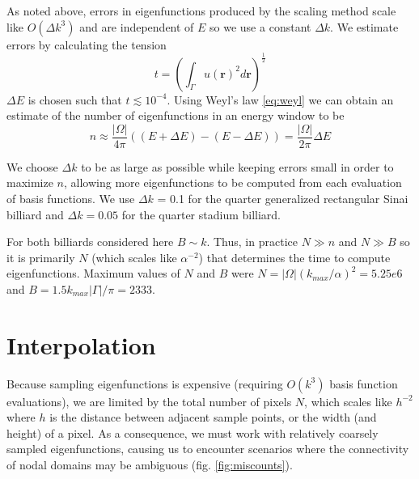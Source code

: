 \documentclass{report}
\newcommand{\rr}[0]{\mathbf{r}}
\begin{document}
As noted above, errors in eigenfunctions produced by the scaling method scale like $O({\Delta k}^{3})$ and are independent of $E$ so we use a constant $\Delta k$. We estimate errors by calculating the tension
\[
t = \left( \int_{\Gamma} u(\rr)^{2} d\rr \right)^{\frac{1}{2}}
\]
$\Delta E$ is chosen such that $t \lesssim 10^{-4}$. Using Weyl's law \ref{eq:weyl} we can obtain an estimate of the number of eigenfunctions in an energy window to be
\[
n \approx \frac{\vert \Omega \vert}{4 \pi} ((E + \Delta E) - (E - \Delta E)) = \frac{\vert \Omega \vert}{2 \pi} \Delta E
\]

We choose $\Delta k$ to be as large as possible while keeping errors small in order to maximize $n$, allowing more eigenfunctions to be computed from each evaluation of basis functions. We use $\Delta k$ = 0.1 for the quarter generalized rectangular Sinai billiard and $\Delta k = 0.05$ for the quarter stadium billiard.

For both billiards considered here $B \sim k$. Thus, in practice $N \gg n$ and $N \gg B$ so it is primarily $N$ (which scales like $\alpha^{-2}$) that determines the time to compute eigenfunctions. Maximum values of $N$ and $B$ were $N = \vert \Omega \vert (k_{max} / \alpha)^2 = 5.25e6$ and $B = 1.5 k_{max} \vert \Gamma \vert / \pi = 2333$.

\section{Interpolation}
\label{sec:interpolation}
Because sampling eigenfunctions is expensive (requiring $O(k^{3})$ basis function evaluations), we are limited by the total number of pixels $N$, which scales like $h^{-2}$ where $h$ is the distance between adjacent sample points, or the width (and height) of a pixel. As a consequence, we must work with relatively coarsely sampled eigenfunctions, causing us to encounter scenarios where the connectivity of nodal domains may be ambiguous (fig. \ref{fig:miscounts}).
\end{document}
